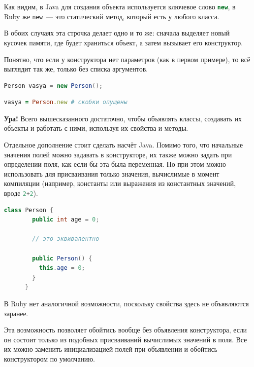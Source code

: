 \documentclass[a4paper, 14pt, titlepage]{extarticle}
\newcommand{\strong}[1]{\textbf{#1}}
\newenvironment{halfpage}%
    {\noindent\begin{minipage}[h]{0.49\linewidth}} %
    {\end{minipage}\hfill}
\newcommand{\inlinecode}[2][Java]{\lstinline[basicstyle=\ttfamily, language=#1]{#2}}
\begin{document}
  Как видим, в Java для создания объекта используется ключевое слово \inlinecode[Java]{new}, в Ruby
  же \inlinecode[Ruby]{new}~--- это статический метод, который есть у любого класса.

  В обоих случаях эта строчка делает одно и то же: сначала выделяет новый кусочек памяти, где будет
  храниться объект, а затем вызывает его конструктор.
  
  Понятно, что если у конструктора нет параметров (как в первом примере), то всё выглядит так же,
  только без списка аргументов.

  \begin{halfpage}
    \begin{lstlisting}[language=Java, title={Создание объекта в Java}, gobble=6, texcl]
      Person vasya = new Person();
    \end{lstlisting}
  \end{halfpage}
  \begin{halfpage}
    \begin{lstlisting}[language=Ruby, title={Создание объекта в Ruby}, gobble=6, texcl]
      vasya = Person.new # скобки опущены
    \end{lstlisting}
  \end{halfpage}

  \vspace{1cm}

  \strong{Ура!} Всего вышесказанного достаточно, чтобы объявлять классы, создавать их объекты и
  работать с ними, используя их свойства и методы.

  \begin{center}
    \begin{halfpage}
      \hrulefill
    \end{halfpage}
  \end{center}

  Отдельное дополнение стоит сделать насчёт Java. Помимо того, что начальные значения полей можно
  задавать в конструкторе, их также можно задать при определении поля, как если бы эта была
  переменная. Но при этом можно использовать для присваивания только значения, вычислимые в момент
  компиляции (например, константы или выражения из константных значений, вроде \inlinecode{2+2}).

  \begin{halfpage}
    \begin{lstlisting}[language=Java, title={Инициализация поля в Java}, gobble=6, texcl]
      class Person {
        public int age = 0;
        
        // это эквивалентно

        public Person() {
          this.age = 0;
        }
      }
    \end{lstlisting}
  \end{halfpage}
  \begin{halfpage}
    В Ruby нет аналогичной возможности, поскольку свойства здесь не объявляются заранее.
  \end{halfpage}

  Эта возможность позволяет обойтись вообще без объявления конструктора, если он состоит только из
  подобных присваиваний вычислимых значений в поля. Все их можно заменить инициализацией полей при объявлении и
  обойтись конструктором по умолчанию.
\end{document}
